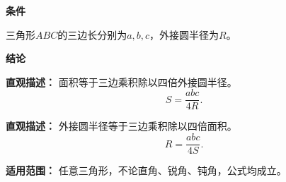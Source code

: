 \begin{statementbox}
	\textbf{\textcolor{CStatement}{条件}}
	\begin{description}[style=nextline, leftmargin=2.8em, labelsep=0.5em, itemsep=0.35em]
		\item[\textbf{\textcolor{CStatement}{条件 1（三边半径）：}}] 三角形$ABC$的三边长分别为$a,b,c$，外接圆半径为$R$。
	\end{description}

	\textbf{\textcolor{CStatement}{结论}}
	\begin{description}[style=nextline, leftmargin=2.8em, labelsep=0.5em, itemsep=0.45em]
		\item[\textbf{\textcolor{CStatement}{结论一（面积公式）：}}]
			\textbf{\textcolor{CStatement}{直观描述：}}
			面积等于三边乘积除以四倍外接圆半径。
			\[
				S = \frac{abc}{4R}.
			\]

		\item[\textbf{\textcolor{CStatement}{推广结论（逆用求半径）：}}]
			\textbf{\textcolor{CStatement}{直观描述：}}
			外接圆半径等于三边乘积除以四倍面积。
			\[
				R = \frac{abc}{4S}.
			\]
	\end{description}

	\textbf{\textcolor{CStatement}{适用范围：}}
	任意三角形，不论直角、锐角、钝角，公式均成立。
\end{statementbox}
